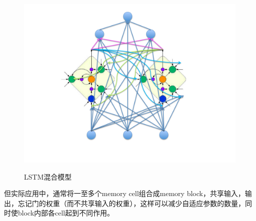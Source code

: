 \begin{figure}[htb]
  \centering
  \includegraphics[scale = 0.5]{Pictures/LSTM/lstm_mixture_model.pdf}\\
  \caption{LSTM混合模型}\label{Fig:lstm_mixture}
\end{figure}

但实际应用中，通常将一至多个memory cell组合成memory block，共享输入，输出，忘记门的权重（而不共享输入的权重），这样可以减少自适应参数的数量，同时使block内部各cell起到不同作用。
